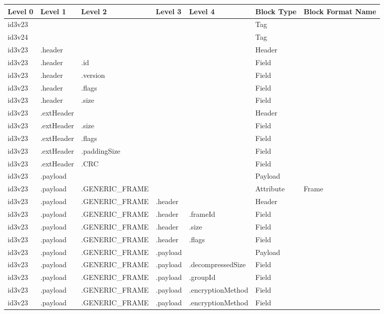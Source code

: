 \begin{longtable}{|p{}|p{}|p{}|p{}|p{}|p{}|p{}|}
	\hline
	Level 0 & Level 1 & Level 2 & Level 3 & Level 4 & Block Type & Block Format Name\\
	\endhead
	\hline
 	id3v23 & & & & & Tag & \\
	\hline
 	id3v24 & & & & & Tag & \\
	\hline
 	id3v23 & .header & & & & Header & \\
	\hline
 	id3v23 & .header & .id & & & Field & \\
	\hline
 	id3v23 & .header & .version & & & Field & \\
	\hline
 	id3v23 & .header & .flags & & & Field & \\
	\hline
 	id3v23 & .header & .size & & & Field & \\
	\hline
 	id3v23 & .extHeader & & & & Header & \\
	\hline
 	id3v23 & .extHeader & .size & & & Field & \\
	\hline
 	id3v23 & .extHeader & .flags & & & Field & \\
	\hline
 	id3v23 & .extHeader & .paddingSize & & & Field & \\
	\hline
 	id3v23 & .extHeader & .CRC & & & Field & \\
	\hline
 	id3v23 & .payload & & & & Payload & \\
	\hline
 	id3v23 & .payload & .GENERIC_FRAME & & & Attribute & Frame \\
	\hline
 	id3v23 & .payload & .GENERIC_FRAME & .header & & Header & \\
	\hline
 	id3v23 & .payload & .GENERIC_FRAME & .header & .frameId & Field & \\
	\hline
 	id3v23 & .payload & .GENERIC_FRAME & .header & .size & Field & \\
	\hline
 	id3v23 & .payload & .GENERIC_FRAME & .header & .flags & Field & \\
	\hline
 	id3v23 & .payload & .GENERIC_FRAME & .payload & & Payload & \\
	\hline
 	id3v23 & .payload & .GENERIC_FRAME & .payload & .decompressedSize & Field & \\
	\hline
 	id3v23 & .payload & .GENERIC_FRAME & .payload & .groupId & Field & \\
	\hline
 	id3v23 & .payload & .GENERIC_FRAME & .payload & .encryptionMethod & Field & \\
	\hline
 	id3v23 & .payload & .GENERIC_FRAME & .payload & .encryptionMethod & Field & \\

\end{longtable}
